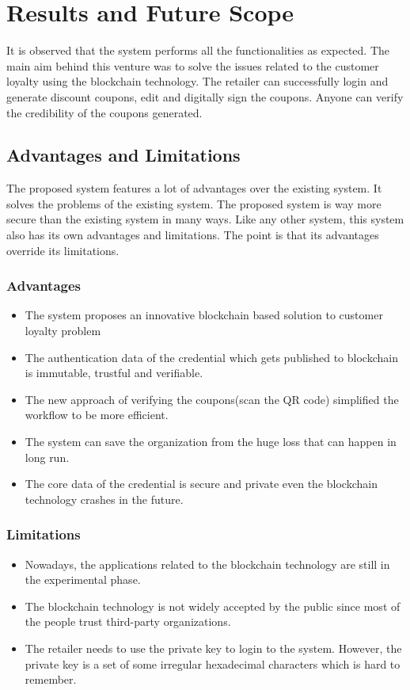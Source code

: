 \chapter{Results and Future Scope}
\par
It is observed that the system performs all the functionalities as expected. The main aim behind this venture was to solve the issues related to the customer loyalty using the blockchain technology. The retailer can  successfully login and generate discount coupons, edit and digitally sign the coupons. Anyone can verify the credibility  of the coupons generated.
\section{Advantages and Limitations}
The proposed system features a lot of advantages over the existing system. It solves the problems of the existing system. The proposed system is way more secure than the existing system in many ways. Like any other system, this system also has its own advantages and limitations. The point is that its advantages override its limitations.
\subsection{Advantages}
\begin{itemize}
\item The system proposes an innovative blockchain based solution to customer loyalty problem 
\item The authentication data of the credential which gets published to blockchain is immutable, trustful and verifiable.
\item The new approach of verifying the coupons(scan the QR code) simplified the workflow to be more efficient.
\item The system can save the organization from the huge loss that can happen in long run.
\item The core data of the credential is secure and private even the blockchain technology crashes in the future.

\end{itemize}
\subsection{Limitations}
\begin{itemize}
\item Nowadays, the applications related to the blockchain technology are still in the experimental phase.
\item The blockchain technology is not widely accepted by the public since most of the people trust third-party organizations.
\item The retailer needs to use the private key to login to the system. However, the private key is a set of some irregular hexadecimal characters which is hard to remember.
\end{itemize}
